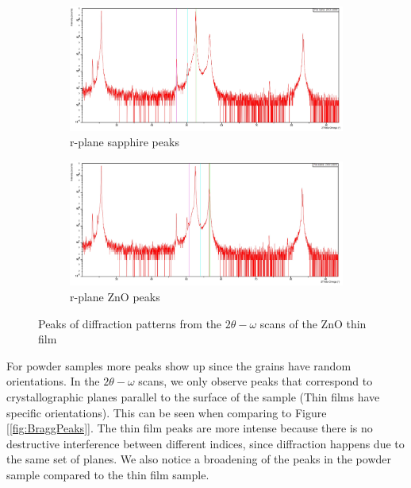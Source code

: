 \documentclass{article}
\begin{document}
\begin{figure}[h]
    \begin{subfigure}[b]{0.45\textwidth}
        \centering
        \includegraphics[width=\textwidth]{Figures/r-plane-sapphire-peaks.jpg} %
        \caption{r-plane sapphire peaks}
        \label{fig:subfig3}
    \end{subfigure}
    \hfill
    \begin{subfigure}[b]{0.45\textwidth}
        \centering
        \includegraphics[width=\textwidth]{Figures/r-plane-ZnO-peaks.jpg} %
        \caption{r-plane ZnO peaks}
        \label{fig:subfig4}
    \end{subfigure}

    \caption{Peaks of diffraction patterns from the $2\theta - \omega$ scans of the ZnO thin film}
    \label{fig:grouped}
\end{figure}

For powder samples more peaks show up since the grains have random orientations. In the $2\theta - \omega$ scans, we only observe peaks that correspond to crystallographic planes parallel to the surface of the sample (Thin films have specific orientations). This can be seen when comparing to Figure [\ref{fig:BraggPeaks}]. The thin film peaks are more intense because there is no destructive interference between different indices, since diffraction happens due to the same set of planes. We also notice a broadening of the peaks in the powder sample compared to the thin film sample. 
\end{document}
